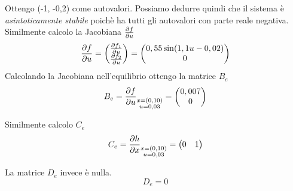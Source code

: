 \documentclass{article}
\begin{document}
Ottengo (-1, -0,2) come autovalori. Possiamo dedurre quindi che il sistema è \emph{asintoticamente stabile} poichè ha tutti gli autovalori con parte reale negativa.
\\
\linebreak
Similmente calcolo la Jacobiana $\diffp{f}{u}$
\begin{equation}
   \diffp{f}{u}=\begin{pmatrix}
   \diffp{f_1}{u}\\
   \diffp{f_2}{u}
   \end{pmatrix} = \begin{pmatrix}
   0,55 \sin(1,1 u -0,02) \\
   0
   \end{pmatrix}
\end{equation}
Calcolando la Jacobiana nell'equilibrio ottengo la matrice $B_e$
\begin{equation}
    B_e = \diffp{f}{u}_{\substack{x=(0,10)\\ u=0,03}}=\begin{pmatrix}
    0,007 \\
    0
    \end{pmatrix}
\end{equation}

Similmente calcolo $C_e$
\begin{equation}
    C_e = \diffp{h}{x}_{\substack{x=(0,10)\\ u=0,03}}=\begin{pmatrix}
    0 & 1
    \end{pmatrix}
\end{equation}

La matrice $D_e$ invece è nulla.
\begin{equation}
    D_e = 0
\end{equation}
\end{document}
